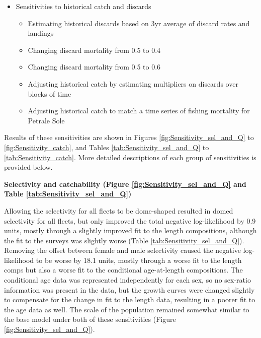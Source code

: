 \documentclass[12pt,]{article}
\begin{document}
\begin{itemize}
\begin{itemize}
  \end{itemize}

  \item Sensitivities to historical catch and discards

  \begin{itemize}

    \item Estimating historical discards based on 3yr average of discard rates and landings
    
    \item Changing discard mortality from 0.5 to 0.4
    
    \item Changing discard mortality from 0.5 to 0.6
    
    \item Adjusting historical catch by estimating multipliers on discards over blocks of time

    \item Adjusting historical catch to match a time series of fishing mortality for Petrale Sole

  \end{itemize}

\end{itemize}

Results of these sensitivities are shown in Figures
\ref{fig:Sensitivity_sel_and_Q} to \ref{fig:Sensitivity_catch}, and
Tables \ref{tab:Sensitivity_sel_and_Q} to \ref{tab:Sensitivity_catch}.
More detailed descriptions of each group of sensitivities is provided
below.

\textbf{Selectivity and catchability (Figure
\ref{fig:Sensitivity_sel_and_Q} and Table
\ref{tab:Sensitivity_sel_and_Q})}

Allowing the selectivity for all fleets to be dome-shaped resulted in
domed selectivity for all fleets, but only improved the total negative
log-likelihood by 0.9 units, mostly through a slightly improved fit to
the length compositions, although the fit to the surveys was slightly
worse (Table \ref{tab:Sensitivity_sel_and_Q}). Removing the offset
between female and male selectivity caused the negative log-likelihood
to be worse by 18.1 units, mostly through a worse fit to the length
comps but also a worse fit to the conditional age-at-length
compositions. The conditional age data was represented independently for
each sex, so no sex-ratio information was present in the data, but the
growth curves were changed slightly to compensate for the change in fit
to the length data, resulting in a poorer fit to the age data as well.
The scale of the population remained somewhat similar to the base model
under both of these sensitivities (Figure
\ref{fig:Sensitivity_sel_and_Q}).
\end{document}
